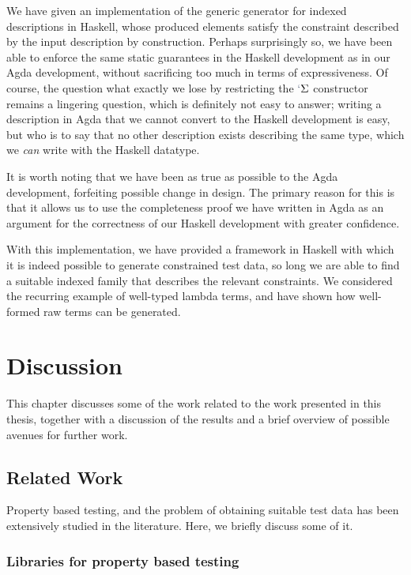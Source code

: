 \documentclass[a4paper,msc,twosized=semi]{uustthesis}
\newcommand*{\mathcolor}{}
\def\mathcolor#1#{\mathcoloraux{#1}}
\newcommand*{\mathcoloraux}[3]{%
  \protect\leavevmode
  \begingroup
    \color#1{#2}#3%
  \endgroup
}
\newcommand{\HSSpecial}[1]{\mathcolor{hsblue4}{#1}}
\begin{document}
  We have given an implementation of the generic generator for indexed descriptions in Haskell, whose produced elements satisfy the constraint described by the input description by construction. Perhaps surprisingly so, we have been able to enforce the same static guarantees in the Haskell development as in our Agda development, without sacrificing too much in terms of expressiveness. Of course, the question what exactly we lose by restricting the \ensuremath{\HSSpecial{`}\Sigma } constructor remains a lingering question, which is definitely not easy to answer; writing a description in Agda that we cannot convert to the Haskell development is easy, but who is to say that no other description exists describing the same type, which we \emph{can} write with the Haskell datatype. 

  It is worth noting that we have been as true as possible to the Agda development, forfeiting possible change in design. The primary reason for this is that it allows us to use the completeness proof we have written in Agda as an argument for the correctness of our Haskell development with greater confidence. 

  With this implementation, we have provided a framework in Haskell with which it is indeed possible to generate constrained test data, so long we are able to find a suitable indexed family that describes the relevant constraints. We considered the recurring example of well-typed lambda terms, and have shown how well-formed raw terms can be generated. 

\chapter{Discussion}
This chapter discusses some of the work related to the work presented in this thesis, 
together with a discussion of the results and a brief overview of possible avenues for 
further work. 

\section{Related Work}

  Property based testing, and the problem of obtaining suitable test data has been 
  extensively studied in the literature. Here, we briefly discuss some of it. 

\subsection{Libraries for property based testing}
\end{document}

